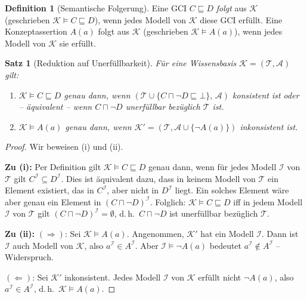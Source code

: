 ﻿\documentclass[a4paper,12pt]{article}
\theoremstyle{definition}
\newtheorem{definition}{Definition}[section]
\theoremstyle{plain}
\newtheorem{satz}{Satz}[section]
\theoremstyle{remark}
\newcommand{\Tbox}{\ensuremath{\mathcal{T}}}
\newcommand{\Abox}{\ensuremath{\mathcal{A}}}
\newcommand{\KB}{\ensuremath{\mathcal{K}}}
\newcommand{\interp}[1]{\ensuremath{\mathcal{#1}}}
\begin{document}
\begin{definition}[Semantische Folgerung]
Eine GCI $C \sqsubseteq D$ \emph{folgt} aus $\KB$
(geschrieben $\KB \models C \sqsubseteq D$), wenn jedes
Modell von $\KB$ diese GCI erf{\"{u}}llt.
Eine Konzeptassertion $A(a)$ folgt aus $\KB$
(geschrieben $\KB \models A(a)$), wenn jedes Modell
von $\KB$ sie erf{\"{u}}llt.
\end{definition}

\begin{satz}[Reduktion auf Unerf{\"{u}}llbarkeit]
\label{satz:red-unerfuell}
F{\"{u}}r eine Wissensbasis $\KB = (\Tbox, \Abox)$ gilt:
\begin{enumerate}[label=(\roman*)]
  \item $\KB \models C \sqsubseteq D$ genau dann, wenn
        $(\Tbox \cup \{C \sqcap \neg D \sqsubseteq \bot\},\, \Abox)$
        konsistent ist oder -- {\"{a}}quivalent --
        wenn $C \sqcap \neg D$ unerf{\"{u}}llbar bez{\"{u}}glich $\Tbox$ ist.
  \item $\KB \models A(a)$ genau dann, wenn
        $\KB' = (\Tbox, \Abox \cup \{\neg A(a)\})$ inkonsistent ist.
\end{enumerate}
\end{satz}

\begin{proof}
Wir beweisen (i) und (ii).

\textbf{Zu (i):}
Per Definition gilt $\KB \models C \sqsubseteq D$
genau dann, wenn f{\"{u}}r jedes Modell $\interp{I}$ von $\Tbox$
gilt $C^\interp{I} \subseteq D^\interp{I}$.
Dies ist {\"{a}}quivalent dazu, dass in keinem Modell von $\Tbox$
ein Element existiert, das in $C^\interp{I}$, aber nicht in
$D^\interp{I}$ liegt.
Ein solches Element w{\"{a}}re aber genau ein Element in
$(C \sqcap \neg D)^\interp{I}$.
Folglich: $\KB \models C \sqsubseteq D$ iff in jedem Modell
$\interp{I}$ von $\Tbox$ gilt $(C \sqcap \neg D)^\interp{I} = \emptyset$,
d.\,h.\ $C \sqcap \neg D$ ist unerf{\"{u}}llbar bez{\"{u}}glich $\Tbox$.

\textbf{Zu (ii):}
$(\Rightarrow)$: Sei $\KB \models A(a)$.
Angenommen, $\KB'$ hat ein Modell $\interp{I}$.
Dann ist $\interp{I}$ auch Modell von $\KB$, also
$a^\interp{I} \in A^\interp{I}$.
Aber $\interp{I} \models \neg A(a)$ bedeutet
$a^\interp{I} \notin A^\interp{I}$ -- Widerspruch.

$(\Leftarrow)$: Sei $\KB'$ inkonsistent.
Jedes Modell $\interp{I}$ von $\KB$ erf{\"{u}}llt nicht $\neg A(a)$,
also $a^\interp{I} \in A^\interp{I}$, d.\,h.\ $\KB \models A(a)$.
\qedhere
\end{proof}
\end{document}
